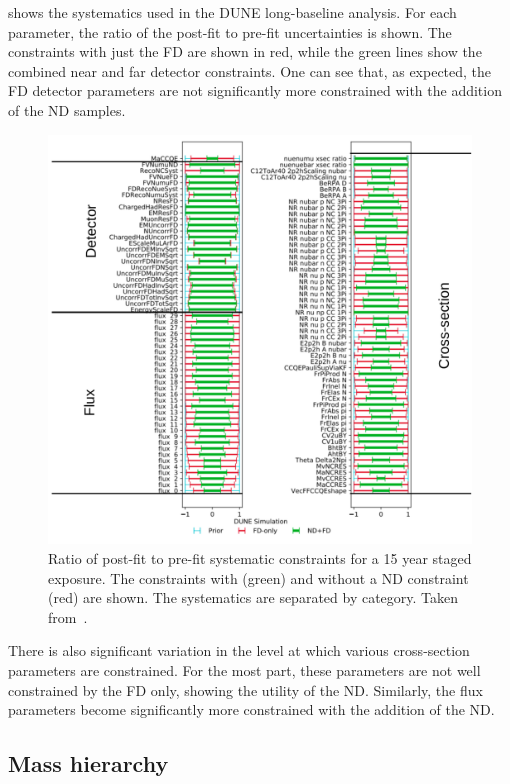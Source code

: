  shows the systematics used in the DUNE long-baseline analysis.
For each parameter, the ratio of the post-fit to pre-fit uncertainties is shown.
The constraints with just the FD are shown in red, while the green lines show the combined near and far detector constraints.
One can see that, as expected, the FD detector parameters are not significantly more constrained with the addition of the ND samples. 

\begin{figure}[h]
	\centering
	\includegraphics[width=.8\linewidth]{files/figures/dune_lbl/constraintsWithLines}
	\caption[DUNE systematic constraints with and without a near detector constraint]{Ratio of post-fit to pre-fit systematic constraints for a 15 year staged exposure. The constraints with (green) and without a ND constraint (red) are shown. The systematics are separated by category. Taken from~\cite{Abi:2020qib}.}
	\label{fig:systConstraints}
\end{figure}

There is also significant variation in the level at which various cross-section parameters are constrained. 
For the most part, these parameters are not well constrained by the FD only, showing the utility of the ND.
Similarly, the flux parameters become significantly more constrained with the addition of the ND.

\subsection{Mass hierarchy}
\label{sec:dune_lbl:sensitivities:mh}

